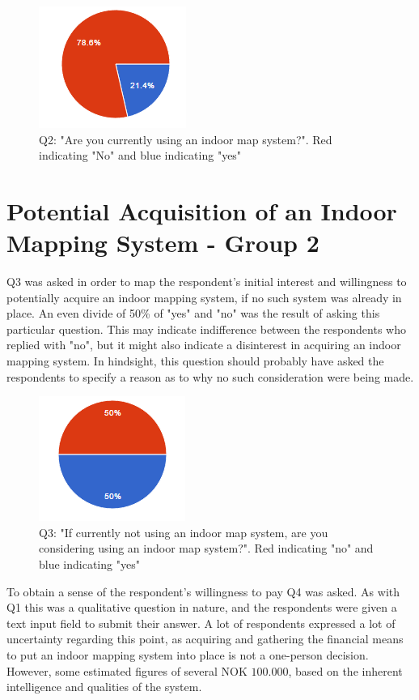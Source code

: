 \begin{figure}
\centering
\includegraphics{figs/Q2.PNG}
\caption{Q2: "Are you currently using an indoor map system?". Red indicating "No" and blue indicating "yes"}
\label{fig:q2}
\end{figure}

\section{Potential Acquisition of an Indoor Mapping System - Group 2}
Q3 was asked in order to map the respondent's initial interest and willingness to potentially acquire an indoor mapping system, if no such system was already in place. An even divide of 50\% of "yes" and "no" was the result of asking this particular question. This may indicate indifference between the respondents who replied with "no", but it might also indicate a disinterest in acquiring an indoor mapping system. In hindsight, this question should probably have asked the respondents to specify a reason as to why no such consideration were being made. 
\begin{figure}[H]
\centering
\includegraphics{figs/q3.PNG}
\caption{Q3: "If currently not using an indoor map system, are you considering using an indoor map system?". Red indicating "no" and blue indicating "yes"}
\label{fig:q3}
\end{figure}
To obtain a sense of the respondent's willingness to pay Q4 was asked. As with Q1 this was a qualitative question in nature, and the respondents were given a text input field to submit their answer. A lot of respondents expressed a lot of uncertainty regarding this point, as acquiring and gathering the financial means to put an indoor mapping system into place is not a one-person decision. However, some estimated figures of several NOK $100.000$, based on the inherent intelligence and qualities of the system.
